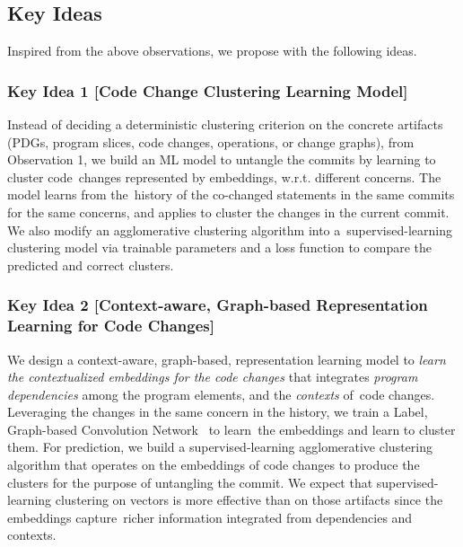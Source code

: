\subsection{Key Ideas}
\label{ideas:sec}

Inspired from the above observations, we propose {\tool} with the
following ideas.


\subsubsection{Key Idea 1 [Code Change Clustering Learning Model]}

Instead of deciding a deterministic clustering criterion on the
concrete artifacts (PDGs, program slices, code changes, operations, or
change graphs), from Observation 1, we build an ML model to untangle
the commits by learning to cluster code~changes represented by
embeddings, w.r.t. different concerns. The model learns from
the~history of the co-changed statements in the same commits for the
same concerns, and applies to cluster the changes in the current
commit.  We also modify an agglomerative clustering algorithm into
a~super\-vised-learning clustering model via trainable parameters and
a loss function to compare the predicted and correct clusters.


\subsubsection{Key Idea 2 [Context-aware, Graph-based
    Representation Learning for Code Changes]}

We design a context-aware, graph-based, representation learning model
to {\em learn the contextualized embeddings for the code changes} that
integrates {\em program dependencies} among the program elements, and
the {\em contexts} of~code changes. Leveraging the changes in the same
concern in the history, we train a Label, Graph-based Convolution
Network~\cite{label-gcn} to learn~the embeddings and learn to cluster
them.
For prediction, we build a supervised-learning agglomerative
clustering algorithm that operates on the embeddings of code changes
to produce the clusters for the purpose of untangling the commit. We
expect that supervised-learning clustering on vectors is more
effective than on those artifacts since the embeddings capture~richer
information integrated from dependencies and contexts.

